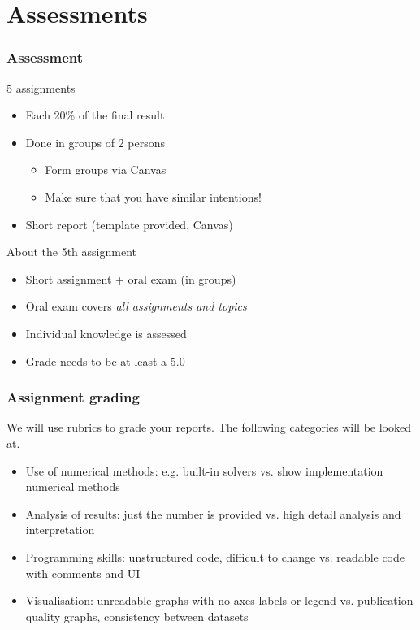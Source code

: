 \documentclass[11pt,table,final,fleqn,xcolor={usenames,dvipsnames},handout]{beamer}
\begin{document}
\section{Assessments}
\begin{frame}
 \frametitle{Assessment}
 \begin{block}{5 assignments}
  \begin{itemize}
    \item Each 20\% of the final result
    \item Done in groups of 2 persons
    \begin{itemize}
      \item Form groups via Canvas
      \item Make sure that you have similar intentions!
    \end{itemize}
    \item Short report (template provided, Canvas)
  \end{itemize}   
 \end{block}
 \pause
 \begin{block}{About the 5th assignment}
  \begin{itemize}
    \item Short assignment + oral exam (in groups)
    \item Oral exam covers \emph{all assignments and topics}
    \item Individual knowledge is assessed
    \item Grade needs to be at least a 5.0
  \end{itemize}   
 \end{block}
\end{frame} 
\begin{frame}
 \frametitle{Assignment grading}
 We will use rubrics to grade your reports. The following categories will be looked at. \pause
    \begin{itemize}[<+->]
    	\item Use of numerical methods: e.g. built-in solvers vs. show implementation numerical methods
    	\item Analysis of results: just the number is provided vs. high detail analysis and interpretation
    	\item Programming skills: unstructured code, difficult to change vs. readable code with comments and UI
    	\item Visualisation: unreadable graphs with no axes labels or legend vs. publication quality graphs, consistency between datasets
    \end{itemize} 
    \vspace*{2em} \pause
\end{frame}
\end{document}
